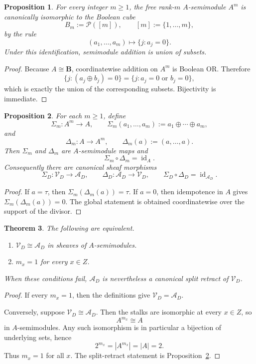 \documentclass[11pt,a4paper]{article}
\newtheorem{theorem}{Theorem}[section]
\newtheorem{proposition}[theorem]{Proposition}
\theoremstyle{definition}
\theoremstyle{remark}
\newcommand{\BB}{\mathbf B}
\newcommand{\cP}{\mathcal P}
\newcommand{\cV}{\mathcal V}
\newcommand{\cA}{\mathcal A}
\newcommand{\taup}{\tau}
\begin{document}
\begin{proposition}\label{prop:boolean-cube}
For every integer $m\ge1$, the free rank-$m$ $A$-semimodule $A^m$ is canonically isomorphic to the Boolean cube
\[
B_m:=\cP([m]),\qquad [m]:=\{1,\dots,m\},
\]
by the rule
\[
(a_1,\dots,a_m)\longmapsto \{j:a_j=0\}.
\]
Under this identification, semimodule addition is union of subsets.
\end{proposition}

\begin{proof}
Because $A\cong\BB$, coordinatewise addition on $A^m$ is Boolean OR.  Therefore
\[
\{j:(a_j\oplus b_j)=0\}=\{j:a_j=0\text{ or }b_j=0\},
\]
which is exactly the union of the corresponding subsets.  Bijectivity is immediate.
\end{proof}

\begin{proposition}\label{prop:retract-shadow}
For each $m\ge1$, define
\[
\Sigma_m:A^m\to A,
\qquad
\Sigma_m(a_1,\dots,a_m):=a_1\oplus\cdots\oplus a_m,
\]
and
\[
\Delta_m:A\to A^m,
\qquad
\Delta_m(a):=(a,\dots,a).
\]
Then $\Sigma_m$ and $\Delta_m$ are $A$-semimodule maps and
\[
\Sigma_m\circ\Delta_m=\operatorname{id}_A.
\]
Consequently there are canonical sheaf morphisms
\[
\Sigma_D:\cV_D\to\cA_D,
\qquad
\Delta_D:\cA_D\to\cV_D,
\qquad
\Sigma_D\circ\Delta_D=\operatorname{id}_{\cA_D}.
\]
\end{proposition}

\begin{proof}
If $a=\taup$, then $\Sigma_m(\Delta_m(a))=\taup$.  If $a=0$, then idempotence in $A$ gives $\Sigma_m(\Delta_m(a))=0$.  The global statement is obtained coordinatewise over the support of the divisor.
\end{proof}

\begin{theorem}\label{thm:reduced-vs-multiplicity}
The following are equivalent.
\begin{enumerate}[label=(\roman*)]
\item $\cV_D\cong\cA_D$ in sheaves of $A$-semimodules.
\item $m_x=1$ for every $x\in Z$.
\end{enumerate}
When these conditions fail, $\cA_D$ is nevertheless a canonical split retract of $\cV_D$.
\end{theorem}

\begin{proof}
If every $m_x=1$, then the definitions give $\cV_D=\cA_D$.

Conversely, suppose $\cV_D\cong\cA_D$.  Then the stalks are isomorphic at every $x\in Z$, so
\[
A^{m_x}\cong A
\]
in $A$-semimodules.  Any such isomorphism is in particular a bijection of underlying sets, hence
\[
2^{m_x}=|A^{m_x}|=|A|=2.
\]
Thus $m_x=1$ for all $x$.  The split-retract statement is Proposition~\ref{prop:retract-shadow}.
\end{proof}
\end{document}
